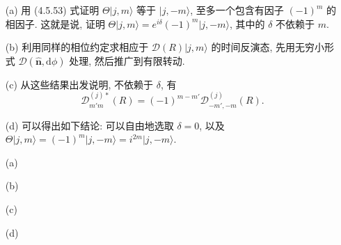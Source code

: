 \documentclass{assignment}
\begin{document}
\begin{prob}[课本习题 4.10]
    \begin{itemize}
        \item[(a)] 用 (4.5.53) 式证明 $\Theta\lvert j,m\rangle$ 等于 $\lvert j,-m\rangle$, 至多一个包含有因子 $(-1)^m$ 的相因子. 这就是说, 证明 $\Theta\lvert j,m\rangle=e^{i\delta}(-1)^m\lvert j,-m\rangle$, 其中的 $\delta$ 不依赖于 $m$.
        \item[(b)] 利用同样的相位约定求相应于 $\mathscr{D}(R)\lvert j,m\rangle$ 的时间反演态, 先用无穷小形式 $\mathscr{D}(\hat{\bm{n}},\mathrm{d}\phi)$ 处理, 然后推广到有限转动.
        \item[(c)] 从这些结果出发说明, 不依赖于 $\delta$, 有
        \[
            \mathscr{D}_{m'm}^{(j)*}(R)=(-1)^{m-m'}\mathscr{D}_{-m',-m}^{(j)}(R).
        \]
        \item[(d)] 可以得出如下结论: 可以自由地选取 $\delta=0$, 以及 $\Theta\lvert j,m\rangle=(-1)^m\lvert j,-m\rangle=i^{2m}\lvert j,-m\rangle$.
    \end{itemize}
\end{prob}
\begin{prob}
    \begin{itemize}
        \item[(a)] 
        \item[(b)] 
        \item[(c)] 
        \item[(d)] 
    \end{itemize}
\end{prob}
\end{document}
